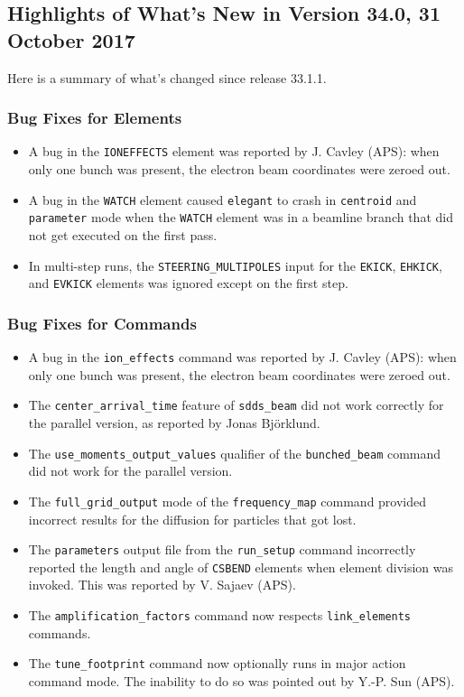\documentclass[11pt]{article}
\begin{document}
\subsection{Highlights of What's New in Version 34.0, 31 October 2017}

Here is a summary of what's changed since release 33.1.1.

\subsubsection{Bug Fixes for Elements}

\begin{itemize}
\item A bug in the \verb|IONEFFECTS| element was reported by J. Cavley (APS): when only one bunch was present,
  the electron beam coordinates were zeroed out.  
\item A bug in the \verb|WATCH| element caused \verb|elegant| to crash in \verb|centroid| and \verb|parameter|
  mode when the \verb|WATCH| element was in a beamline branch that did not get executed on the first pass.
\item In multi-step runs, the \verb|STEERING_MULTIPOLES| input for the \verb|EKICK|, \verb|EHKICK|, and \verb|EVKICK| elements
  was ignored except on the first step.
\end{itemize}

\subsubsection{Bug Fixes for Commands}
\begin{itemize}
\item A bug in the \verb|ion_effects| command was reported by J. Cavley (APS): when only one bunch was present,
  the electron beam coordinates were zeroed out. 
\item The \verb|center_arrival_time| feature of \verb|sdds_beam| did not work correctly for the parallel version, as
  reported by Jonas Bj{\"o}rklund. 
\item The \verb|use_moments_output_values| qualifier of the \verb|bunched_beam| command did not work for the parallel
  version. 
\item The \verb|full_grid_output| mode of the \verb|frequency_map| command provided incorrect results for the
  diffusion for particles that got lost.
\item The \verb|parameters| output file from the \verb|run_setup| command incorrectly reported the length and angle
  of \verb|CSBEND| elements when element division was invoked. This was reported by V. Sajaev (APS).
\item The \verb|amplification_factors| command now respects \verb|link_elements| commands.
\item The \verb|tune_footprint| command now optionally runs in major action command mode. The inability to do so
  was pointed out by Y.-P. Sun (APS).
\end{itemize}
\end{document}
